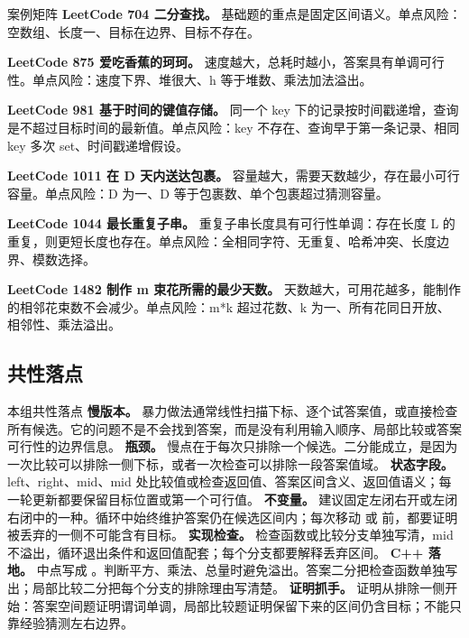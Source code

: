 \begin{principlebox}{案例矩阵}
\textbf{LeetCode 704 二分查找。}
基础题的重点是固定区间语义。单点风险：空数组、长度一、目标在边界、目标不存在。

\textbf{LeetCode 875 爱吃香蕉的珂珂。}
速度越大，总耗时越小，答案具有单调可行性。单点风险：速度下界、堆很大、h 等于堆数、乘法加法溢出。

\textbf{LeetCode 981 基于时间的键值存储。}
同一个 key 下的记录按时间戳递增，查询是不超过目标时间的最新值。单点风险：key 不存在、查询早于第一条记录、相同 key 多次 set、时间戳递增假设。

\textbf{LeetCode 1011 在 D 天内送达包裹。}
容量越大，需要天数越少，存在最小可行容量。单点风险：D 为一、D 等于包裹数、单个包裹超过猜测容量。

\textbf{LeetCode 1044 最长重复子串。}
重复子串长度具有可行性单调：存在长度 L 的重复，则更短长度也存在。单点风险：全相同字符、无重复、哈希冲突、长度边界、模数选择。

\textbf{LeetCode 1482 制作 m 束花所需的最少天数。}
天数越大，可用花越多，能制作的相邻花束数不会减少。单点风险：m*k 超过花数、k 为一、所有花同日开放、相邻性、乘法溢出。

\end{principlebox}

\subsection{共性落点}

\begin{principlebox}{本组共性落点}
\textbf{慢版本。} 暴力做法通常线性扫描下标、逐个试答案值，或直接检查所有候选。它的问题不是不会找到答案，而是没有利用输入顺序、局部比较或答案可行性的边界信息。
\textbf{瓶颈。} 慢点在于每次只排除一个候选。二分能成立，是因为一次比较可以排除一侧下标，或者一次检查可以排除一段答案值域。
\textbf{状态字段。} left、right、mid、mid 处比较值或检查返回值、答案区间含义、返回值语义；每一轮更新都要保留目标位置或第一个可行值。
\textbf{不变量。} 建议固定左闭右开或左闭右闭中的一种。循环中始终维护答案仍在候选区间内；每次移动  或  前，都要证明被丢弃的一侧不可能含有目标。
\textbf{实现检查。} 检查函数或比较分支单独写清，mid 不溢出，循环退出条件和返回值配套；每个分支都要解释丢弃区间。
\textbf{C++ 落地。} 中点写成 。判断平方、乘法、总量时避免溢出。答案二分把检查函数单独写出；局部比较二分把每个分支的排除理由写清楚。
\textbf{证明抓手。} 证明从排除一侧开始：答案空间题证明谓词单调，局部比较题证明保留下来的区间仍含目标；不能只靠经验猜测左右边界。
\end{principlebox}

